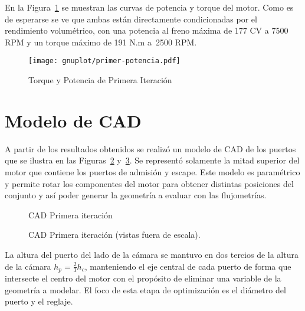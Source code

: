 En la Figura~\ref{fig:PoTi_primer_op} se muestran las curvas de potencia y
torque del motor.
%
Como es de esperarse se ve que ambas están directamente condicionadas por el
rendimiento volumétrico, con una potencia al freno máxima de 177 CV a 7500 RPM y
un torque máximo de 191 N.m a\ 2500 RPM.

\begin{figure}[h!]
  \centering
  \texttt{[image: gnuplot/primer-potencia.pdf]}
  \caption{Torque y Potencia de Primera Iteración} \label{fig:PoTi_primer_op}
\end{figure}


\section{Modelo de CAD}
%
A partir de los resultados obtenidos se realizó un modelo de CAD de los puertos
que se ilustra en las Figuras~\ref{fig:motor_cad1} y~\ref{fig:motor_cad2}.
%
Se representó solamente la mitad superior del motor que contiene los puertos
de admisión y escape.
%
Este modelo es paramétrico y permite rotar los componentes del motor para
obtener distintas posiciones del conjunto y así poder generar la geometría a
evaluar con las flujometrías.


\begin{figure}[h!]
  \centering
  \caption{CAD Primera iteración}\label{fig:motor_cad1}
\end{figure}


\begin{figure}[h!]
  \centering
  \hfill
  \caption{CAD Primera iteración (vistas fuera de escala).}\label{fig:motor_cad2}
\end{figure}

La altura del puerto del lado de la cámara se mantuvo en dos tercios de la
altura de la cámara $h_{p} = \frac{2}{3}h_{c}$, manteniendo el eje central de cada
puerto de forma que intersecte el centro del motor con el propósito de eliminar
una variable de la geometría a modelar.
%
El foco de esta etapa de optimización es el diámetro del puerto y el reglaje.
%

